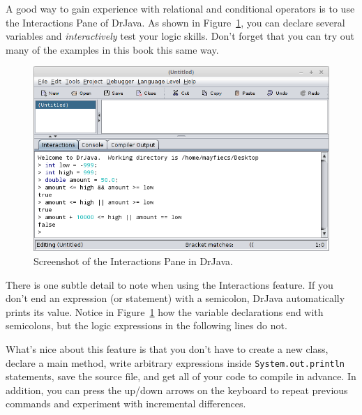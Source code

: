 \documentclass[12pt]{book}
\theoremstyle{exercise}
\newcommand{\java}[1]{\lstinline{#1}} %
\begin{document}
A good way to gain experience with relational and conditional operators is to use the Interactions Pane of DrJava.
As shown in Figure~\ref{fig:drjava}, you can declare several variables and {\it interactively} test your logic skills.
Don't forget that you can try out many of the examples in this book this same way.

%

\begin{figure}[!h]
\begin{center}
\includegraphics[width=\textwidth]{figs/drjava-logic.png}
\caption{Screenshot of the Interactions Pane in DrJava.}
\label{fig:drjava}
\end{center}
\end{figure}

There is one subtle detail to note when using the Interactions feature.
If you don't end an expression (or statement) with a semicolon, DrJava automatically prints its value.
Notice in Figure~\ref{fig:drjava} how the variable declarations end with semicolons, but the logic expressions in the following lines do not.

What's nice about this feature is that you don't have to create a new class, declare a main method, write arbitrary expressions inside \java{System.out.println} statements, save the source file, and get all of your code to compile in advance.
In addition, you can press the up/down arrows on the keyboard to repeat previous commands and experiment with incremental differences.

\end{document}
